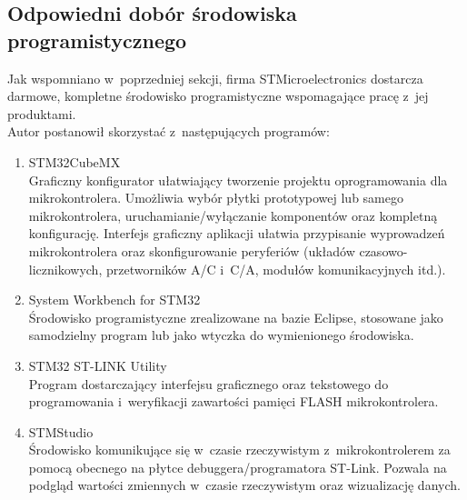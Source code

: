 \subsection{Odpowiedni dobór środowiska programistycznego}
\label{sec:IDE}
Jak wspomniano w~poprzedniej sekcji, firma STMicroelectronics dostarcza darmowe, kompletne środowisko programistyczne wspomagające pracę z~jej produktami.\\
Autor postanowił skorzystać z~następujących programów:
\begin{enumerate}
	\item STM32CubeMX\\ 
	Graficzny konfigurator ułatwiający tworzenie projektu oprogramowania dla mikrokontrolera. Umożliwia wybór płytki prototypowej lub samego mikrokontrolera, uruchamianie/wyłączanie komponentów oraz kompletną konfigurację. Interfejs graficzny aplikacji ułatwia przypisanie wyprowadzeń mikrokontrolera oraz skonfigurowanie peryferiów (układów czasowo-licznikowych, przetworników A/C i~C/A, modułów komunikacyjnych itd.).
	\item System Workbench for STM32\\
	Środowisko programistyczne zrealizowane na bazie Eclipse, stosowane jako samodzielny program lub jako wtyczka do wymienionego środowiska.
	\item STM32 ST-LINK Utility\\
	Program dostarczający interfejsu graficznego oraz tekstowego do programowania i~weryfikacji zawartości pamięci FLASH mikrokontrolera.
	\item STMStudio\\
	Środowisko komunikujące się w~czasie rzeczywistym z~mikrokontrolerem za pomocą obecnego na płytce debuggera/programatora ST-Link. Pozwala na podgląd wartości zmiennych w~czasie rzeczywistym oraz wizualizację danych. %
\end{enumerate}	